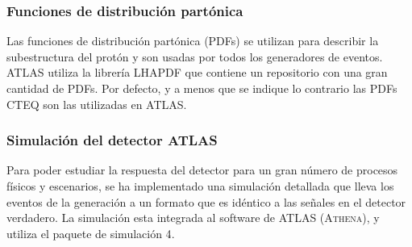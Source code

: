 


\subsubsection{Funciones de distribución partónica}

Las funciones de distribución partónica (PDFs) se utilizan para describir la
subestructura del protón y son usadas por todos los generadores de eventos.
ATLAS utiliza la librería LHAPDF\cite{Bourilkov:2006cj} que contiene un
repositorio con una gran
cantidad de PDFs. Por defecto, y a menos que se indique lo contrario las PDFs
CTEQ son las utilizadas en ATLAS.


\subsubsection{Simulación del detector ATLAS}

Para poder estudiar la respuesta del detector para un gran número de procesos
físicos y escenarios, se ha implementado una simulación detallada que lleva los
eventos de la generación a un formato que es idéntico a las señales en el
detector verdadero\cite{AtlasSim}. La simulación esta integrada al software de
ATLAS (\textsc{Athena}), y utiliza el paquete de simulación
{\geant}4\cite{Geant4}.

